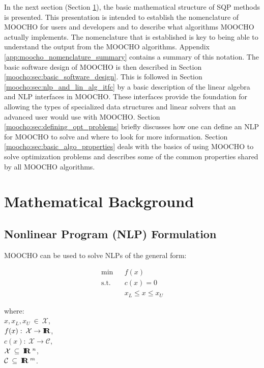 \documentclass[pdf,12pt,report]{SANDreport}
\begin{document}
In the next section (Section {}\ref{moocho:sec:sqp_background}), the basic
mathematical structure of SQP methods is presented.  This presentation is
intended to establish the nomenclature of MOOCHO for users and developers and
to describe what algorithms MOOCHO actually implements.  The nomenclature that
is established is key to being able to understand the output from the MOOCHO
algorithms.  Appendix {}\ref{app:moocho_nomenclature_summary} contains a
summary of this notation.  The basic software design of MOOCHO is then
described in Section {}\ref{moocho:sec:basic_software_design}.  This is
followed in Section {}\ref{moocho:sec:nlp_and_lin_alg_itfc} by a basic
description of the linear algebra and NLP interfaces in MOOCHO.  These
interfaces provide the foundation for allowing the types of specialized data
structures and linear solvers that an advanced user would use with MOOCHO.
Section {}\ref{moocho:sec:defining_opt_problems} briefly discusses how one can
define an NLP for MOOCHO to solve and where to look for more information.
Section {}\ref{moocho:sec:basic_algo_properties} deals with the basics of
using MOOCHO to solve optimization problems and describes some of the common
properties shared by all MOOCHO algorithms.

%
\section{Mathematical Background}
\label{moocho:sec:sqp_background}
%

%
\subsection{Nonlinear Program (NLP) Formulation}
\label{moocho:sec:nlp_formulation}
%

MOOCHO can be used to solve NLPs of the general form: 

{\bsinglespace
\begin{eqnarray}
\mbox{min}  &  & f(x)                     \label{moocho:eqn:nlp:obj} \\
\mbox{s.t.} &  & c(x) = 0                 \label{moocho:eqn:nlp:equ} \\
            &  & x_L \leq x    \leq x_U   \label{moocho:eqn:nlp:bnds}
\end{eqnarray}
\begin{tabbing}
\hspace{4ex}where:\hspace{5ex}\= \\
\>	$x, x_L, x_U \:\in\:\mathcal{X}$, \\
\>	$f(x) : \:\mathcal{X} \rightarrow \mbox{\textbf{I}}\hspace{-0.6ex}\mbox{\textbf{R}}$, \\
\>	$c(x) : \:\mathcal{X} \rightarrow \mathcal{C}$, \\
\>	$\mathcal{X} \:\subseteq\:\mbox{\textbf{I}}\hspace{-0.6ex}\mbox{\textbf{R}}\:^n$, \\
\>	$\mathcal{C} \:\subseteq\:\mbox{\textbf{I}}\hspace{-0.6ex}\mbox{\textbf{R}}\:^m$.
\end{tabbing}
\esinglespace}
\end{document}
